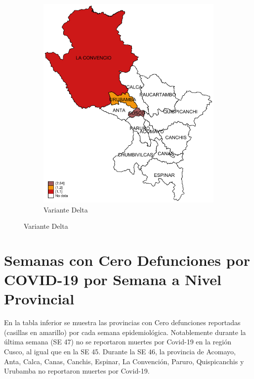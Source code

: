 \documentclass[12pt,a4paper,openany]{book}
\begin{document}
\begin{figure}[h]
				\vspace{10mm}
				\begin{subfigure}[b]{0.40\textwidth}
					\centering
					\includegraphics[width=\textwidth]{../figuras/variantes_provincial_delta.pdf}
					\caption{Variante Delta}
				\end{subfigure}
			\end{figure}

\clearpage


\clearpage
	\section*{Semanas con Cero Defunciones por COVID-19 por Semana a Nivel Provincial}
	
	\noindent En la tabla inferior se muestra las provincias con Cero defunciones reportadas (casillas en amarillo) por cada semana epidemiológica. Notablemente durante la última semana (SE 47) no se reportaron muertes por Covid-19 en la región Cusco, al igual que en la SE 45. Durante la SE 46, la provincia de Acomayo, Anta, Calca, Canas, Canchis, Espinar, La Convención, Paruro, Quispicanchis y Urubamba no reportaron muertes por Covid-19.  
	
\end{document}
